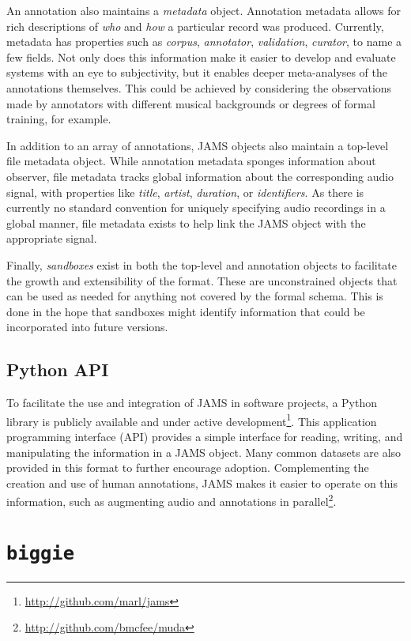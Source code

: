 An annotation also maintains a \emph{metadata} object.
Annotation metadata allows for rich descriptions of \emph{who} and \emph{how} a particular record was produced.
Currently, metadata has properties such as \emph{corpus}, \emph{annotator}, \emph{validation}, \emph{curator}, to name a few fields.
Not only does this information make it easier to develop and evaluate systems with an eye to subjectivity, but it enables deeper meta-analyses of the annotations themselves.
This could be achieved by considering the observations made by annotators with different musical backgrounds or degrees of formal training, for example.

In addition to an array of annotations, JAMS objects also maintain a top-level file metadata object.
While annotation metadata sponges information about observer, file metadata tracks global information about the corresponding audio signal, with properties like \emph{title}, \emph{artist}, \emph{duration}, or \emph{identifiers}.
As there is currently no standard convention for uniquely specifying audio recordings in a global manner, file metadata exists to help link the JAMS object with the appropriate signal.

Finally, \emph{sandboxes} exist in both the top-level and annotation objects to facilitate the growth and extensibility of the format.
These are unconstrained objects that can be used as needed for anything not covered by the formal schema.
This is done in the hope that sandboxes might identify information that could be incorporated into future versions.


\subsection{Python API}
\label{subsec:jams_tools}

To facilitate the use and integration of JAMS in software projects, a Python library is publicly available and under active development\footnote{\url{http://github.com/marl/jams}}.
This application programming interface (API) provides a simple interface for reading, writing, and manipulating the information in a JAMS object.
Many common datasets are also provided in this format to further encourage adoption.
Complementing the creation and use of human annotations, JAMS makes it easier to operate on this information, such as augmenting audio and annotations in parallel\footnote{\url{http://github.com/bmcfee/muda}}.


\section{\texttt{biggie}}
\label{sec:biggie}

